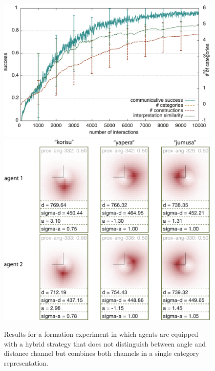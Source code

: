 \begin{figure}
\begin{center}
\includegraphics[width=0.9\columnwidth]{figs/category-formation-proximal-angular-results+categories-1}
\includegraphics[width=0.8\columnwidth]{figs/category-formation-proximal-angular-results+categories-2.png}
\end{center}
\caption[Results formation of hybrid systems]{Results for a formation 
experiment in which agents are equipped with a hybrid
strategy that does not distinguish between angle and distance 
channel but combines both channels in a single 
category representation.}
\label{f:proximal-angular+results}
\end{figure}



%
%
%